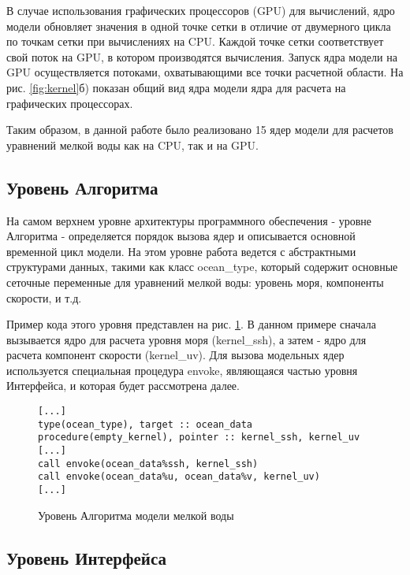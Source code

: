 В случае использования графических процессоров (GPU) для вычислений, ядро модели обновляет значения в одной точке сетки в отличие от двумерного цикла по точкам сетки при вычислениях на CPU.
Каждой точке сетки соответствует свой поток на GPU, в котором производятся вычисления.
Запуск ядра модели на GPU осуществляется потоками, охватывающими все точки расчетной области. На рис. \ref{fig:kernel}б) показан общий вид ядра модели ядра для расчета на графических процессорах.

Таким образом, в данной работе было реализовано 15 ядер модели для расчетов уравнений мелкой воды как на CPU, так и на GPU.

\subsection{Уровень Алгоритма}

На самом верхнем уровне архитектуры программного обеспечения - уровне Алгоритма - определяется порядок вызова ядер и описывается основной временной цикл модели. На этом уровне работа ведется с абстрактными структурами данных, такими как класс ocean\_type, который содержит основные сеточные переменные для уравнений мелкой воды: уровень моря, компоненты скорости, и т.д.

Пример кода этого уровня представлен на рис. \ref{fig:algorithm}. В данном примере сначала вызывается ядро для расчета уровня моря (kernel\_ssh), а затем - ядро для расчета компонент скорости (kernel\_uv). Для вызова модельных ядер используется специальная процедура envoke, являющаяся частью уровня Интерфейса, и которая будет рассмотрена далее.

\begin{figure}[!ht]
	\centering
	\begin{lstlisting}
[...]
type(ocean_type), target :: ocean_data
procedure(empty_kernel), pointer :: kernel_ssh, kernel_uv
[...]
call envoke(ocean_data%ssh, kernel_ssh)
call envoke(ocean_data%u, ocean_data%v, kernel_uv)
[...]
	\end{lstlisting}
	\vspace{3pt}
	\caption{Уровень Алгоритма модели мелкой воды}
	\label{fig:algorithm}
\end{figure}

\subsection{Уровень Интерфейса}

